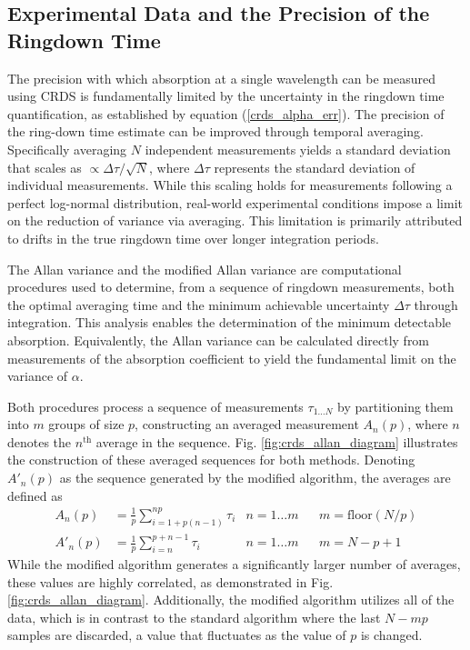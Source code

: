\documentclass[8pt,a4paper]{report}
\begin{document}
	\subsection{Experimental Data and the Precision of the Ringdown Time}
	The precision with which absorption at a single wavelength can be measured using CRDS is fundamentally limited by the uncertainty in the ringdown time quantification, as established by equation (\ref{crds_alpha_err}). The precision of the ring-down time estimate can be improved through temporal averaging. Specifically averaging $N$ independent measurements yields a standard deviation that scales as $\propto \Delta \tau / \sqrt{N}$, where $\Delta \tau$ represents the standard deviation of individual measurements. While this scaling holds for measurements following a perfect log-normal distribution, real-world experimental conditions impose a limit on the reduction of variance via averaging. This limitation is primarily attributed to drifts in the true ringdown time over longer integration periods.
	
	The Allan variance and the modified Allan variance \cite{allan_variance_mod} are computational procedures used to determine, from a sequence of ringdown measurements, both the optimal averaging time and the minimum achievable uncertainty $\Delta \tau$ through integration. This analysis enables the determination of the minimum detectable absorption. Equivalently, the Allan variance can be calculated directly from measurements of the absorption coefficient to yield the fundamental limit on the variance of $\alpha$.
	
	Both procedures process a sequence of measurements $\tau_{1\ldots N}$ by partitioning them into $m$ groups of size $p$, constructing an averaged measurement $A_n(p)$, where $n$ denotes the $n^\mathrm{th}$ average in the sequence. Fig. \ref{fig:crds_allan_diagram} illustrates the construction of these averaged sequences for both methods. Denoting $A'_n(p)$ as the sequence generated by the modified algorithm, the averages are defined as
	\begin{align}
		A_n(p) &= \frac{1}{p} \sum_{i=1 + p(n-1)}^{np}\tau_i& n=1\ldots m && m = \mathrm{floor}(N/p)  \\
		A'_n(p) &= \frac{1}{p} \sum_{i=n}^{p+n-1}\tau_i& n=1\ldots m && m = N - p + 1
	\end{align}
	While the modified algorithm generates a significantly larger number of averages, these values are highly correlated, as demonstrated in Fig. \ref{fig:crds_allan_diagram}. Additionally, the modified algorithm utilizes all of the data, which is in contrast to the standard algorithm where the last $N - mp$ samples are discarded, a value that fluctuates as the value of $p$ is changed.
	
\end{document}
